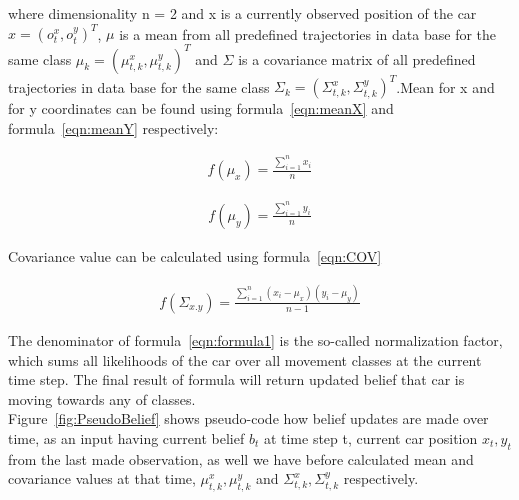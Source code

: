 where dimensionality n = 2 and x is a currently observed position of the car $x = (o_t^x, o_t^y)^T$, $\mu$ is a mean from all predefined trajectories in data base for the same class $\mu_k  = (\mu_{t,k}^x, \mu_{t,k}^y)^T$ and $\Sigma$ is a covariance matrix of all predefined trajectories in data base for the same class $\Sigma_k  = (\Sigma_{t,k}^x, \Sigma_{t,k}^y)^T$.Mean for x and for y coordinates can be found using formula~\ref{eqn:meanX} and formula~\ref{eqn:meanY} respectively:

\begin{equation}
\begin{split}
f(\mu_x) = \displaystyle \frac{\sum_{i=1}^{n} x_i}{n}
\end{split}
\label{eqn:meanX}
\end{equation}

\begin{equation}
\begin{split}
f(\mu_y) = \displaystyle \frac{\sum_{i=1}^{n} y_i}{n}
\end{split}
\label{eqn:meanY}
\end{equation}

Covariance value can be calculated using formula~\ref{eqn:COV}

\begin{equation}
\begin{split}
f(\Sigma_{x.y}) = \displaystyle \frac{\sum_{i=1}^{n} (x_i - \mu_x)(y_i - \mu_y)}{n-1}
\end{split}
\label{eqn:COV}
\end{equation}

The denominator of formula~\ref{eqn:formula1} is the so-called normalization factor, which sums all likelihoods of the car over all movement classes at the current time step. The final result of formula will return updated belief that car is moving towards any of classes. \\

Figure~\ref{fig:PseudoBelief} shows pseudo-code how belief updates are made over time, as an input having current belief $b_t$ at time step t, current car position $x_t, y_t$ from the last made observation, as well we have before calculated mean and covariance values at that time, $\mu_{t,k}^x, \mu_{t,k}^y$ and $\Sigma_{t,k}^x, \Sigma_{t,k}^y$ respectively.

